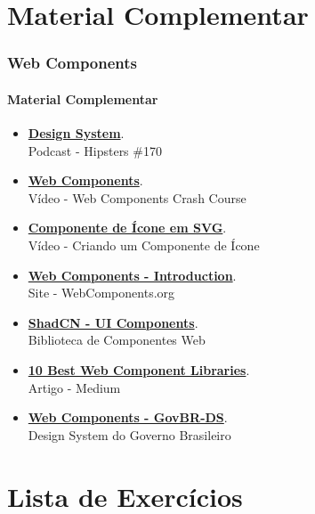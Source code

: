 \documentclass[
	9pt, %
	t, %
]{beamer}
\newcommand{\iconLink}[2]{\href{#1}{\faLink \hspace{0.2em} {#2}}}
\begin{document}
\section{Material Complementar}

\begin{frame}
	\frametitle{Web Components}
	\framesubtitle{Material Complementar}

	\begin{itemize}
		\item \iconLink{https://www.hipsters.tech/design-systems-hipsters-170/}{\textbf{Design System}}.\\Podcast - Hipsters \#170
		\item \iconLink{https://www.youtube.com/watch?v=PCWaFLy3VUo}{\textbf{Web Components}}.\\Vídeo - Web Components Crash Course
		\item \iconLink{https://youtu.be/7tsyjXxaloI?list=PL6BL1eKvLWOvfRhcDB0a5XJ2PD1_Rol6K}{\textbf{Componente de Ícone em SVG}}.\\Vídeo - Criando um Componente de Ícone
		\item \iconLink{https://www.webcomponents.org/introduction}{\textbf{Web Components - Introduction}}.\\Site - WebComponents.org
		\item \iconLink{https://ui.shadcn.com/}{\textbf{ShadCN - UI Components}}.\\Biblioteca de Componentes Web
		\item \iconLink{https://medium.com/@yourkube/10-best-web-component-libraries-b470541277e8}{\textbf{10 Best Web Component Libraries}}.\\Artigo - Medium
		\item \iconLink{https://webcomponent-ds.estaleiro.serpro.gov.br}{\textbf{Web Components - GovBR-DS}}.\\Design System do Governo Brasileiro
	\end{itemize}

\end{frame}

\section{Lista de Exercícios}
\end{document}
